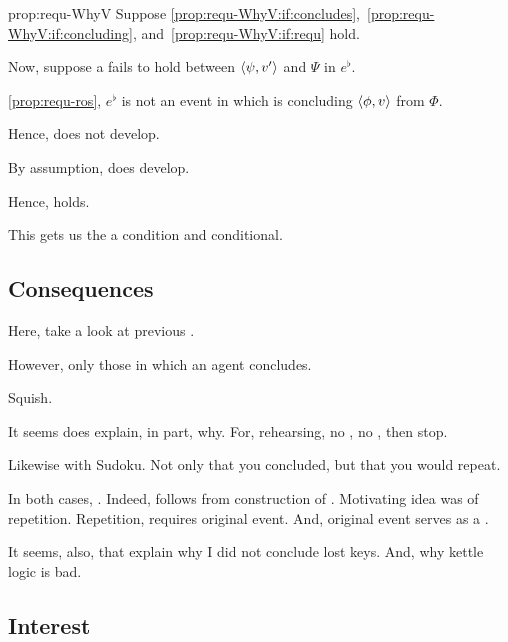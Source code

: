 \begin{note}
  \begin{argument}{prop:requ-WhyV}
    Suppose \ref{prop:requ-WhyV:if:concludes},~\ref{prop:requ-WhyV:if:concluding}, and~\ref{prop:requ-WhyV:if:requ} hold.

    Now, suppose a \ros{} fails to hold between \(\langle \psi, v' \rangle\) and \(\Psi\) in \(e^{\flat}\).

    \autoref{prop:requ-ros}, \(e^{\flat}\) is not an event in which \vAgent{} is concluding \(\langle \phi, v \rangle\) from \(\Phi\).

    Hence, does not develop.

    By assumption, does develop.

    Hence, \ros{} holds.

    This gets us the a condition and conditional.
  \end{argument}
\end{note}

\subsection{Consequences}
\label{sec:consequences}

\begin{note}
  Here, take a look at previous .

  However, only those in which an agent concludes.
\end{note}

\begin{note}
  Squish.

  It seems does explain, in part, why.
  For, rehearsing, no \ros{}, no \fc{}, then stop.

  Likewise with Sudoku.
  Not only that you concluded, but that you would repeat.
\end{note}

\begin{note}
  In both cases, \wit{}.
  Indeed, \wit{} follows from construction of .
  Motivating idea was of repetition.
  Repetition, requires original event.
  And, original event serves as a \wit{}.
\end{note}

\begin{note}
  It seems, also, that explain why I did not conclude lost keys.
  And, why kettle logic is bad.
\end{note}

\subsection{Interest}
\label{sec:interest}

